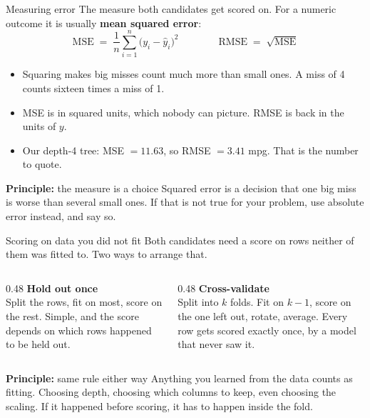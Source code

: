 \documentclass[aspectratio=169]{beamer}
\newenvironment{principle}[1]{\begin{block}{\textbf{Principle:} #1}}{\end{block}}
\begin{document}
\begin{frame}{Measuring error}
The measure both candidates get scored on. For a numeric outcome it is usually
\textbf{mean squared error}:
\[
\text{MSE} \;=\; \frac{1}{n}\sum_{i=1}^{n}\bigl(y_i - \hat{y}_i\bigr)^2
\qquad\qquad
\text{RMSE} \;=\; \sqrt{\text{MSE}}
\]
\begin{itemize}\small
  \item Squaring makes big misses count much more than small ones. A miss of 4 counts sixteen
        times a miss of 1.
  \item MSE is in squared units, which nobody can picture. RMSE is back in the units of $y$.
  \item Our depth-4 tree: MSE $= 11.63$, so RMSE $= 3.41$ mpg. That is the number to quote.
\end{itemize}
\begin{principle}{the measure is a choice}
Squared error is a decision that one big miss is worse than several small ones. If that is not
true for your problem, use absolute error instead, and say so.
\end{principle}
\end{frame}

\begin{frame}{Scoring on data you did not fit}
Both candidates need a score on rows neither of them was fitted to. Two ways to arrange that.
\begin{columns}[T]
\begin{column}{0.48\textwidth}
\textbf{Hold out once}\\[3pt]
Split the rows, fit on most, score on the rest. Simple, and the score depends on which rows
happened to be held out.
\end{column}
\begin{column}{0.48\textwidth}
\textbf{Cross-validate}\\[3pt]
Split into $k$ folds. Fit on $k-1$, score on the one left out, rotate, average. Every row gets
scored exactly once, by a model that never saw it.
\end{column}
\end{columns}
\vspace{0.5em}
\begin{principle}{same rule either way}
Anything you learned from the data counts as fitting. Choosing depth, choosing which columns to
keep, even choosing the scaling. If it happened before scoring, it has to happen inside the fold.
\end{principle}
\end{frame}
\end{document}
